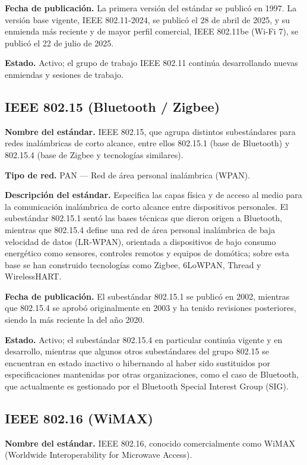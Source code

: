 \documentclass[12pt,letterpaper]{article}
\begin{document}
\textbf{Fecha de publicación.} La primera versión del estándar se publicó en 1997. La versión base vigente, IEEE 802.11-2024, se publicó el 28 de abril de 2025, y su enmienda más reciente y de mayor perfil comercial, IEEE 802.11be (Wi-Fi 7), se publicó el 22 de julio de 2025.

\textbf{Estado.} Activo; el grupo de trabajo IEEE 802.11 continúa desarrollando nuevas enmiendas y sesiones de trabajo.

\subsection{IEEE 802.15 (Bluetooth / Zigbee)}

\textbf{Nombre del estándar.} IEEE 802.15, que agrupa distintos subestándares para redes inalámbricas de corto alcance, entre ellos 802.15.1 (base de Bluetooth) y 802.15.4 (base de Zigbee y tecnologías similares).

\textbf{Tipo de red.} PAN — Red de área personal inalámbrica (WPAN).

\textbf{Descripción del estándar.} Especifica las capas física y de acceso al medio para la comunicación inalámbrica de corto alcance entre dispositivos personales. El subestándar 802.15.1 sentó las bases técnicas que dieron origen a Bluetooth, mientras que 802.15.4 define una red de área personal inalámbrica de baja velocidad de datos (LR-WPAN), orientada a dispositivos de bajo consumo energético como sensores, controles remotos y equipos de domótica; sobre esta base se han construido tecnologías como Zigbee, 6LoWPAN, Thread y WirelessHART.

\textbf{Fecha de publicación.} El subestándar 802.15.1 se publicó en 2002, mientras que 802.15.4 se aprobó originalmente en 2003 y ha tenido revisiones posteriores, siendo la más reciente la del año 2020.

\textbf{Estado.} Activo; el subestándar 802.15.4 en particular continúa vigente y en desarrollo, mientras que algunos otros subestándares del grupo 802.15 se encuentran en estado inactivo o hibernando al haber sido sustituidos por especificaciones mantenidas por otras organizaciones, como el caso de Bluetooth, que actualmente es gestionado por el Bluetooth Special Interest Group (SIG).

\subsection{IEEE 802.16 (WiMAX)}

\textbf{Nombre del estándar.} IEEE 802.16, conocido comercialmente como WiMAX (Worldwide Interoperability for Microwave Access).
\end{document}
